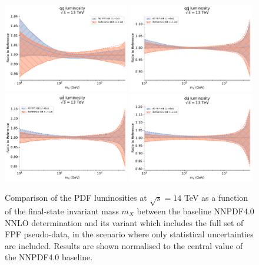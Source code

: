 \begin{figure}[t]
\centering
\includegraphics[width=0.49\textwidth]{plots/qqlumi_nnpdf40_allfpf.pdf}
\includegraphics[width=0.49\textwidth]{plots/qqbarlumi_nnpdf40_allfpf.pdf}
\includegraphics[width=0.49\textwidth]{plots/udbarlumi_nnpdf40_allfpf.pdf}
\includegraphics[width=0.49\textwidth]{plots/dubarlumi_nnpdf40_allfpf.pdf}
\caption{Comparison of the PDF luminosities at $\sqrt{s}=14$ TeV
  as a function of the final-state invariant mass $m_X$ between
  the baseline NNPDF4.0 NNLO determination and its variant which includes
  the full set of FPF pseudo-data, in the scenario where only statistical uncertainties
  are included. 
  Results are shown normalised to the central value of the NNPDF4.0 baseline.
%
}
\label{fig:nnpdf40_fpf_lumis}
\end{figure}

